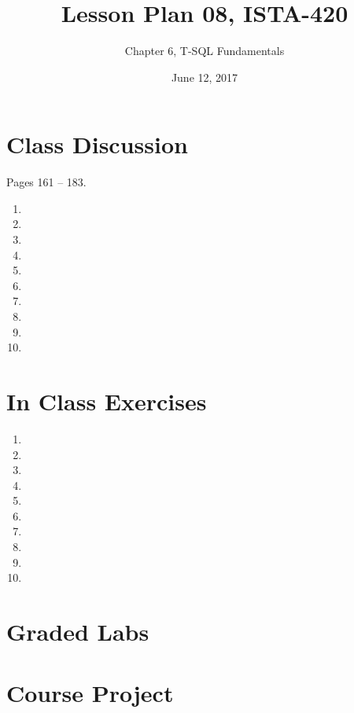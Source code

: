 \documentclass{article}
\title{Lesson Plan 08, ISTA-420}
\author{Chapter 6, T-SQL Fundamentals}
\date{June 12, 2017}
\begin{document}
    

    \maketitle{}

    \section{Class Discussion}

    Pages 161 -- 183.

    \begin{enumerate}
        \item 
        \item 
        \item 
        \item 
        \item 
        \item 
        \item 
        \item 
        \item 
        \item 
    \end{enumerate}

    \section{In Class Exercises}

    \begin{enumerate}
        \item 
        \item 
        \item 
        \item 
        \item 
        \item 
        \item 
        \item 
        \item 
        \item 
    \end{enumerate}

    \section{Graded Labs}



    \section{Course Project}
\end{document}

